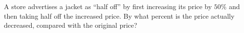 A store advertises a jacket as ``half off'' by first increasing its price by $50\%$ and then taking half off the increased price. By what percent is the price actually decreased, compared with the original price?
